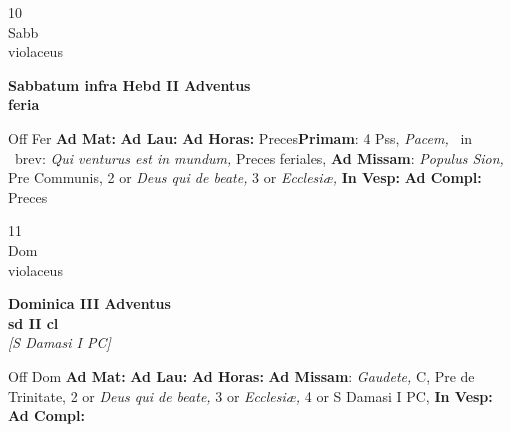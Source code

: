 \documentclass[10pt, openany]{book}
\begin{document}
        \begin{center}
            \begin{minipage}{3.5in}
                \vspace{2em}
                \begin{minipage}{0.5in}
                    {\Huge 10} \\
                    {\normalsize Sabb} \\
                    {\normalsize violaceus}
                \end{minipage}
                \begin{minipage}{3.0in}
                    \textbf{ \large Sabbatum infra Hebd II Adventus \\
                    \textnormal{\normalsize feria}} \\ 
                \end{minipage}
                \begin{justify}Off Fer
                    \textbf{Ad Mat: }
                    \textbf{Ad Lau: }
                    \textbf{Ad Horas: }Preces\textbf{Primam}: 4 Pss, \textit{Pacem,} \Vbar\ in \Rbar\ brev: \textit{Qui venturus est in mundum,} Preces feriales, \textbf{Ad Missam}: \textit{Populus Sion,} Pre Communis, 2 or \textit{Deus qui de beate,} 3 or \textit{Ecclesiæ,}  
                    \textbf{In Vesp: }
                    \textbf{Ad Compl: }Preces
                \end{justify}
            \end{minipage}
        \end{center}
    
        \begin{center}
            \begin{minipage}{3.5in}
                \vspace{2em}
                \begin{minipage}{0.5in}
                    {\Huge 11} \\
                    {\normalsize Dom} \\
                    {\normalsize violaceus}
                \end{minipage}
                \begin{minipage}{3.0in}
                    \textbf{ \large Dominica III Adventus \\
                    \textnormal{\normalsize sd II cl}} \\ \textit{[S Damasi I PC]} \\ 
                \end{minipage}
                \begin{justify}Off Dom
                    \textbf{Ad Mat: }
                    \textbf{Ad Lau: }
                    \textbf{Ad Horas: }\textbf{Ad Missam}: \textit{Gaudete,} C, Pre de Trinitate, 2 or \textit{Deus qui de beate,} 3 or \textit{Ecclesiæ,} 4 or S Damasi I PC,  
                    \textbf{In Vesp: }
                    \textbf{Ad Compl: }
                \end{justify}
            \end{minipage}
        \end{center}
    
\end{document}
